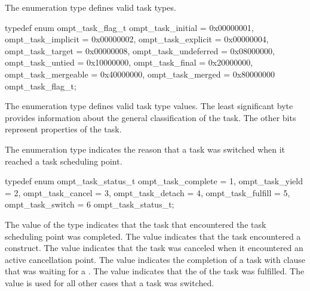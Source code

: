 \label{sec:ompt_task_flag_t}

\summary
The  enumeration type defines valid task types.

\format
\begin{ccppspecific}
\begin{omptEnum}
typedef enum ompt_task_flag_t {
  ompt_task_initial                   = 0x00000001,
  ompt_task_implicit                  = 0x00000002,
  ompt_task_explicit                  = 0x00000004,
  ompt_task_target                    = 0x00000008,
  ompt_task_undeferred                = 0x08000000,
  ompt_task_untied                    = 0x10000000,
  ompt_task_final                     = 0x20000000,
  ompt_task_mergeable                 = 0x40000000,
  ompt_task_merged                    = 0x80000000
} ompt_task_flag_t;
\end{omptEnum}
\end{ccppspecific}

\descr
The  enumeration type defines valid task type values.
The least significant byte provides information about the general classification 
of the task. The other bits represent properties of the task.




\label{sec:ompt_task_status_t}

\summary
The  enumeration type indicates the reason 
that a task was switched when it reached a task scheduling point.

\format
\begin{ccppspecific}
\begin{omptEnum}
typedef enum ompt_task_status_t {
  ompt_task_complete  = 1,
  ompt_task_yield     = 2,
  ompt_task_cancel    = 3,
  ompt_task_detach    = 4,
  ompt_task_fulfill   = 5,
  ompt_task_switch    = 6
} ompt_task_status_t;
\end{omptEnum}
\end{ccppspecific}

\descr
The value  of the  type  indicates 
that the task that encountered the task scheduling point was completed. The value 
 indicates that the task encountered a  
construct. The value  indicates that the task was canceled 
when it encountered an active cancellation point. The value  
indicates the completion of a task with  clause that was waiting for a 
. The value  indicates that the 
 of the task was fulfilled. The value 
 is used for all other cases that a task was switched.



